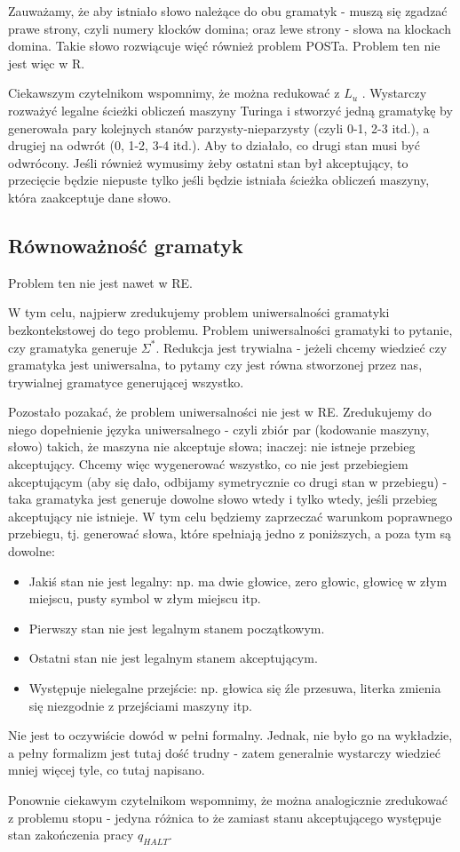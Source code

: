 Zauważamy, że aby istniało słowo należące do obu gramatyk - muszą się zgadzać prawe strony, czyli numery klocków domina; oraz lewe strony - słowa na klockach domina. Takie słowo rozwiącuje więć również problem POSTa. Problem ten nie jest więc w R.

Ciekawszym czytelnikom wspomnimy, że można redukować z \( L_u \) . Wystarczy rozważyć legalne ścieżki obliczeń maszyny Turinga i stworzyć jedną gramatykę by generowała pary kolejnych stanów parzysty-nieparzysty (czyli 0-1, 2-3 itd.), a drugiej na odwrót (0, 1-2, 3-4 itd.). Aby to działało, co drugi stan musi być odwrócony. Jeśli również wymusimy żeby ostatni stan był akceptujący, to przecięcie będzie niepuste tylko jeśli będzie istniała ścieżka obliczeń maszyny, która zaakceptuje dane słowo.

\subsection{Równoważność gramatyk}

Problem ten nie jest nawet w RE.

W tym celu, najpierw zredukujemy problem uniwersalności gramatyki bezkontekstowej do tego problemu. Problem uniwersalności gramatyki to pytanie, czy gramatyka generuje \( \Sigma^* \). Redukcja jest trywialna - jeżeli chcemy wiedzieć czy gramatyka jest uniwersalna, to pytamy czy jest równa stworzonej przez nas, trywialnej gramatyce generującej wszystko.

Pozostało pozakać, że problem uniwersalności nie jest w RE. Zredukujemy do niego dopełnienie języka uniwersalnego - czyli zbiór par (kodowanie maszyny, słowo) takich, że maszyna nie akceptuje słowa; inaczej: nie istneje przebieg akceptujący. Chcemy więc wygenerować wszystko, co nie jest przebiegiem akceptującym (aby się dało, odbijamy symetrycznie co drugi stan w przebiegu) - taka gramatyka jest generuje dowolne słowo wtedy i tylko wtedy, jeśli przebieg akceptujący nie istnieje. W tym celu będziemy zaprzeczać warunkom poprawnego przebiegu, tj. generować słowa, które spełniają jedno z poniższych, a poza tym są dowolne:

\begin{itemize}
    \item Jakiś stan nie jest legalny: np. ma dwie głowice, zero głowic, głowicę w złym miejscu, pusty symbol w złym miejscu itp.
    \item Pierwszy stan nie jest legalnym stanem początkowym.
    \item Ostatni stan nie jest legalnym stanem akceptującym.
    \item Występuje nielegalne przejście: np. głowica się źle przesuwa, literka zmienia się niezgodnie z przejściami maszyny itp.
\end{itemize}

Nie jest to oczywiście dowód w pełni formalny. Jednak, nie było go na wykładzie, a pełny formalizm jest tutaj dość trudny - zatem generalnie wystarczy wiedzieć mniej więcej tyle, co tutaj napisano.

Ponownie ciekawym czytelnikom wspomnimy, że można analogicznie zredukować z problemu stopu - jedyna różnica to że zamiast stanu akceptującego występuje stan zakończenia pracy \( q_{HALT} \).